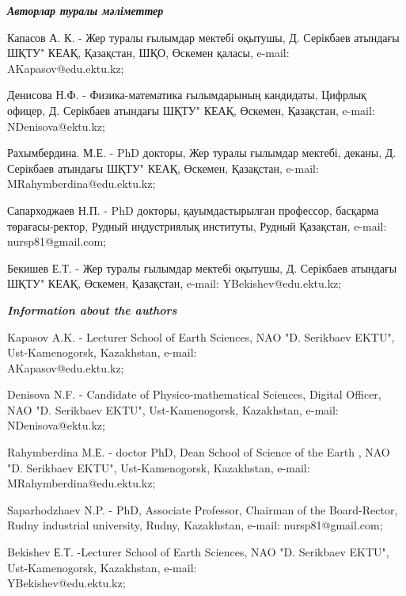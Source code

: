 \begin{authorinfo}
\emph{{\bfseries Авторлар туралы мәліметтер}}

Капасов А. К. - Жер туралы ғылымдар мектебі оқытушы, Д. Серікбаев
атындағы ШҚТУ" КЕАҚ, Қазақстан, ШҚО, Өскемен қаласы, e-mail:
AKapasov@edu.ektu.kz;

Денисова Н.Ф. - Физика-математика ғылымдарының кандидаты, Цифрлық
офицер, Д. Серікбаев атындағы ШҚТУ" КЕАҚ, Өскемен, Қазақстан, e-mail:
NDenisova@ektu.kz;

Рахымбердина. М.Е. - PhD докторы, Жер туралы ғылымдар мектебі, деканы,
Д. Серікбаев атындағы ШҚТУ" КЕАҚ, Өскемен, Қазақстан, e-mail:
MRahymberdina@edu.ektu.kz;

Сапарходжаев Н.П. - PhD докторы, қауымдастырылған профессор, басқарма
төрағасы-ректор, Рудный индустриялық институты, Рудный Қазақстан, e-mail:
nursp81@gmail.com;

Бекишев Е.Т. - Жер туралы ғылымдар мектебі оқытушы, Д. Серікбаев
атындағы ШҚТУ" КЕАҚ, Өскемен, Қазақстан, e-mail:
YBekishev@edu.ektu.kz;

\emph{{\bfseries Information about the authors}}

Kapasov A.K. - Lecturer School of Earth Sciences, NAO "D. Serikbaev
EKTU", Ust-Kamenogorsk, Kazakhstan,
e-mail: \\AKapasov@edu.ektu.kz;

Denisova N.F. - Candidate of Physico-mathematical Sciences, Digital
Officer, NAO "D. Serikbaev EKTU", Ust-Kamenogorsk, Kazakhstan, e-mail:
NDenisova@ektu.kz;

Rahymberdina M.Е. - doctor PhD, Dean School of Science of the Earth ,
NAO "D. Serikbaev EKTU", Ust-Kamenogorsk, Kazakhstan,  e-mail:
MRahymberdina@edu.ektu.kz;

Saparhodzhaev N.P. - PhD, Associate Professor, Chairman of the
Board-Rector, Rudny industrial university, Rudny, Kazakhstan, e-mail:
nursp81@gmail.com;

Bekishev Е.Т. -Lecturer School of Earth Sciences, NAO "D. Serikbaev
EKTU", Ust-Kamenogorsk, Kazakhstan, e-mail: \\YBekishev@edu.ektu.kz;
\end{authorinfo}
